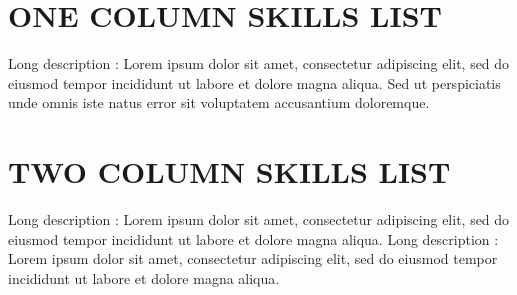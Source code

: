 \documentclass[letterpaper,11pt]{article}
\begin{document}

\section{ONE COLUMN SKILLS LIST}
{
  Long description : Lorem ipsum dolor sit amet, 
  consectetur adipiscing elit, sed do eiusmod tempor
  incididunt ut labore et dolore magna aliqua.
  Sed ut perspiciatis unde omnis iste natus error sit
  voluptatem accusantium doloremque.
}

\section{TWO COLUMN SKILLS LIST}
{
  Long description : Lorem ipsum dolor sit amet, 
  consectetur adipiscing elit, sed do eiusmod tempor
  incididunt ut labore et dolore magna aliqua.
}
{
  Long description : Lorem ipsum dolor sit amet, 
  consectetur adipiscing elit, sed do eiusmod tempor
  incididunt ut labore et dolore magna aliqua.
}







\end{document}
